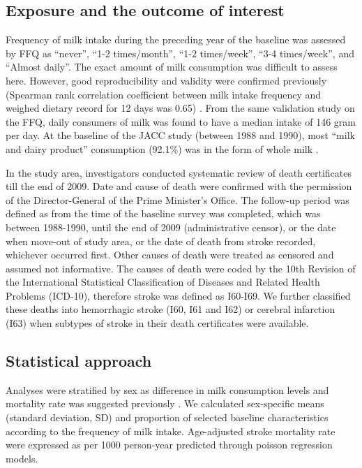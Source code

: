 \documentclass[nutrients,article,submitted,moreauthors,pdftex]{Definitions/mdpi}
\begin{document}
\hypertarget{exposure-and-the-outcome-of-interest}{%
\subsection{Exposure and the outcome of
interest}\label{exposure-and-the-outcome-of-interest}}

Frequency of milk intake during the preceding year of the baseline was
assessed by FFQ as ``never'', ``1-2 times/month'', ``1-2 times/week'',
``3-4 times/week'', and ``Almost daily''. The exact amount of milk
consumption was difficult to assess here. However, good reproducibility
and validity were confirmed previously (Spearman rank correlation
coefficient between milk intake frequency and weighed dietary record for
12 days was 0.65) \citep{Date2005}. From the same validation study
\citep{Date2005} on the FFQ, daily consumers of milk was found to have a
median intake of 146 gram per day. At the baseline of the JACC study
(between 1988 and 1990), most ``milk and dairy product'' consumption
(92.1\%) was in the form of whole milk \citep{eigyogenjyo}.

In the study area, investigators conducted systematic review of death
certificates till the end of 2009. Date and cause of death were
confirmed with the permission of the Director-General of the Prime
Minister's Office. The follow-up period was defined as from the time of
the baseline survey was completed, which was between 1988-1990, until
the end of 2009 (administrative censor), or the date when move-out of
study area, or the date of death from stroke recorded, whichever
occurred first. Other causes of death were treated as censored and
assumed not informative. The causes of death were coded by the 10th
Revision of the International Statistical Classification of Diseases and
Related Health Problems (ICD-10), therefore stroke was defined as
I60-I69. We further classified these deaths into hemorrhagic stroke
(I60, I61 and I62) or cerebral infarction (I63) when subtypes of stroke
in their death certificates were available.

\hypertarget{statistical-approach}{%
\subsection{Statistical approach}\label{statistical-approach}}

Analyses were stratified by sex as difference in milk consumption levels
and mortality rate was suggested previously
\citep{wang_milk_2015, Talaei_2016}. We calculated sex-specific means
(standard deviation, SD) and proportion of selected baseline
characteristics according to the frequency of milk intake. Age-adjusted
stroke mortality rate were expressed as per 1000 person-year predicted
through poisson regression models.
\end{document}
